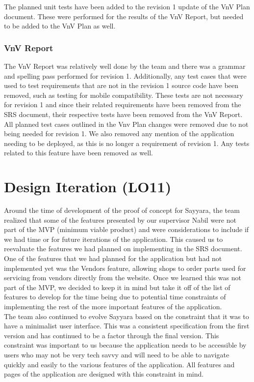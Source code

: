 \documentclass{article}
\begin{document}
\noindent The planned unit tests have been added to the revision 1 update of the VnV Plan document. These were performed for the results of the VnV Report, but needed to be added to the VnV Plan as well.

\subsubsection{VnV Report}

The VnV Report was relatively well done by the team and there was a grammar and spelling pass performed for revision 1. Additionally, any test cases that were used to test requirements that are not in the revision 1 source code have been removed, such as testing for mobile compatibility. These tests are not necessary for revision 1 and since their related requirements have been removed from the SRS document, their respective tests have been removed from the VnV Report. All planned test cases outlined in the Vnv Plan changes were removed due to not being needed for revision 1. We also removed any mention of the application needing to be deployed, as this is no longer a requirement of revision 1. Any tests related to this feature have been removed as well.\\

\section{Design Iteration (LO11)} 

\noindent Around the time of development of the proof of concept for Sayyara, the team realized that some of the features presented by our supervisor Nabil
were not part of the MVP (minimum viable product) and were considerations to include if we had time or for future iterations of the application. This caused
us to reevaluate the features we had planned on implementing in the SRS document. One of the features that we had planned for the application but had not
implemented yet was the Vendors feature, allowing shops to order parts used for servicing from vendors directly from the website. Once we learned this was
not part of the MVP, we decided to keep it in mind but take it off of the list of features to develop for the time being due to potential time constraints
of implementing the rest of the more important features of the application.\\

\noindent The team also continued to evolve Sayyara based on the constraint that it was to have a minimalist user interface. This was a consistent
specification from the first version and has continued to be a factor through the final version. This constraint was important to us because the application
needs to be accessible by users who may not be very tech savvy and will need to be able to navigate quickly and easily to the various features of the
application. All features and pages of the application are designed with this constraint in mind.\\
\end{document}
